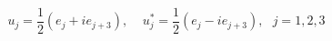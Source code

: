 \begin{equation}                      
u_{j} = \frac{1}{2} (e_{j} +i e_{j+3}) ,                      
~~~~~u_{j}^{*} = \frac{1}{2} (e_{j} -i e_{j+3}) , ~~~j=1,2,3  \label{eq:ellidokuz}                    
\end{equation} 

